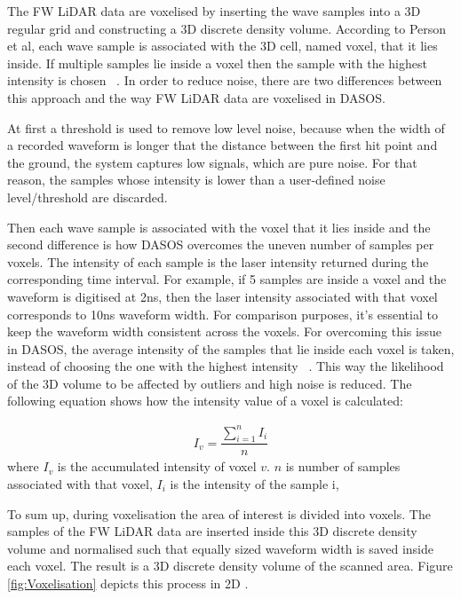 \documentclass{subfiles}
\begin{document}
		
		
	\par The FW LiDAR data are voxelised by inserting the wave samples into a 3D regular grid and constructing a 3D discrete density volume. According to Person et al, each wave sample is associated with the 3D cell, named voxel, that it lies inside. If multiple samples lie inside a voxel then the sample with the highest intensity is chosen ~\cite{Persson2005}. In order to reduce noise, there are two differences between this approach and the way FW LiDAR data are voxelised in DASOS. 
		
		
	\par At first a threshold is used to remove low level noise, because when the width of a recorded waveform is longer that the distance between the first hit point and the ground, the system captures low signals, which are pure noise. For that reason, the samples whose intensity is lower than a user-defined noise level/threshold are discarded. 
		
		
		\par Then each wave sample is associated with the voxel that it lies inside and the second difference is how DASOS overcomes the uneven number of samples per voxels. The intensity of each sample is the laser intensity returned during the corresponding time interval. For example, if 5 samples are inside a voxel and the waveform is digitised at 2ns, then the laser intensity associated with that voxel corresponds to 10ns waveform width. For comparison purposes, it's essential to keep the waveform width consistent across the voxels. For overcoming this issue in DASOS, the average intensity of the samples that lie inside each voxel is taken, instead of choosing the one with the highest intensity ~\cite{Persson2005}. This way the likelihood of the 3D volume to be affected by outliers and high noise is reduced. The following equation shows how the intensity value of a voxel is calculated:
		
		\begin{eqnarray}
		I_{v} = \dfrac{\sum_{i=1}^{n}I_{i}}{n}
		\end{eqnarray} 
		where 		$I_{v}$ is the accumulated intensity of voxel $v$. 
		$n$ is number of samples associated with that voxel, 
		$I_{i}$ is the intensity of the sample i, 
		
		To sum up, during voxelisation the area of interest is divided into voxels. The samples of the FW LiDAR data are inserted inside this 3D discrete density volume and normalised such that equally sized waveform width is saved inside each voxel. The result is a 3D discrete density volume of the scanned area. Figure \ref{fig:Voxelisation} depicts this process in 2D \footnotemark[1].
		
\end{document}
